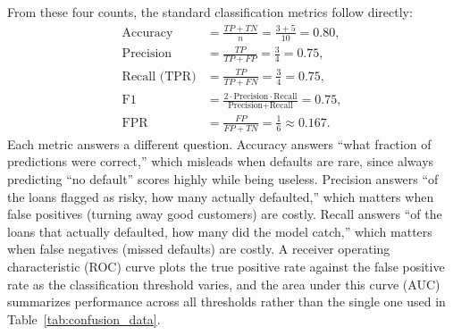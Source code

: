 \documentclass[../ai_in_finance]{subfiles}
\begin{document}
From these four counts, the standard classification metrics follow directly:
\begin{align*}
\text{Accuracy} &= \frac{TP+TN}{n} = \frac{3+5}{10} = 0.80, \\
\text{Precision} &= \frac{TP}{TP+FP} = \frac{3}{4} = 0.75, \\
\text{Recall (TPR)} &= \frac{TP}{TP+FN} = \frac{3}{4} = 0.75, \\
\text{F1} &= \frac{2 \cdot \text{Precision} \cdot \text{Recall}}{\text{Precision}+\text{Recall}} = 0.75, \\
\text{FPR} &= \frac{FP}{FP+TN} = \frac{1}{6} \approx 0.167.
\end{align*}
Each metric answers a different question. Accuracy answers ``what fraction of predictions were correct,'' which misleads when defaults are rare, since always predicting ``no default'' scores highly while being useless. Precision answers ``of the loans flagged as risky, how many actually defaulted,'' which matters when false positives (turning away good customers) are costly. Recall answers ``of the loans that actually defaulted, how many did the model catch,'' which matters when false negatives (missed defaults) are costly. A receiver operating characteristic (ROC) curve plots the true positive rate against the false positive rate as the classification threshold varies, and the area under this curve (AUC) summarizes performance across all thresholds rather than the single one used in Table~\ref{tab:confusion_data}.

\end{document}
